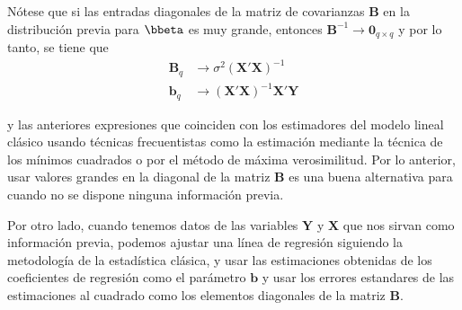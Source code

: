 Nótese que si las entradas diagonales de la matriz de covarianzas $\mathbf{B}$ en la distribución previa para $\bbeta$ es muy grande, entonces $\mathbf{B}^{-1}\longrightarrow \mathbf{0}_{q\times q}$ y por lo tanto, se tiene que
\begin{align*}
\mathbf{B}_q &\longrightarrow \sigma^2(\mathbf{X}'\mathbf{X})^{-1}\\
\mathbf{b}_q &\longrightarrow (\mathbf{X}'\mathbf{X})^{-1}\mathbf{X}'\mathbf{Y}
\end{align*}

y las anteriores expresiones que coinciden con los estimadores del modelo lineal clásico usando técnicas frecuentistas como la estimación mediante la técnica de los mínimos cuadrados o por el método de máxima verosimilitud. Por lo anterior, usar valores grandes en la diagonal de la matriz $\mathbf{B}$ es una buena alternativa para cuando no se dispone ninguna información previa.

Por otro lado, cuando tenemos datos de las variables $\mathbf{Y}$ y $\mathbf{X}$ que nos sirvan como información previa, podemos ajustar una línea de regresión siguiendo la metodología de la estadística clásica, y usar las estimaciones obtenidas de los coeficientes de regresión como el parámetro $\mathbf{b}$ y usar los errores estandares de las estimaciones al cuadrado como los elementos diagonales de la matriz $\mathbf{B}$.

